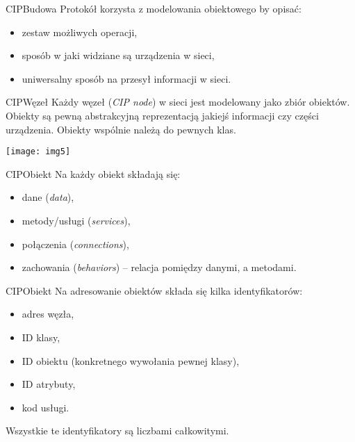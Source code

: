 \documentclass[11pt]{beamer}
\begin{document}
\begin{frame}{CIP}{Budowa}
Protokół korzysta z modelowania obiektowego by opisać:
\begin{itemize}
\item zestaw możliwych operacji,
\item sposób w jaki widziane są urządzenia w sieci,
\item uniwersalny sposób na przesył informacji w sieci.
\end{itemize}
\end{frame}


\begin{frame}{CIP}{Węzeł}
Każdy węzeł (\emph{CIP node}) w sieci jest modelowany jako zbiór obiektów. Obiekty są pewną abstrakcyjną
reprezentacją jakiejś informacji czy części urządzenia. Obiekty wspólnie należą do pewnych klas.

\medskip

\begin{center}
	\texttt{[image: img5]}
\end{center}
\end{frame}


\begin{frame}{CIP}{Obiekt}
Na każdy obiekt składają się:
\begin{itemize}
\item dane (\emph{data}),
\item metody/usługi (\emph{services}),
\item połączenia (\emph{connections}),
\item zachowania (\emph{behaviors}) -- relacja pomiędzy danymi, a metodami.
\end{itemize}
\end{frame}


\begin{frame}{CIP}{Obiekt}
Na adresowanie obiektów składa się kilka identyfikatorów:
\begin{itemize}
\item adres węzła,
\item ID klasy,
\item ID obiektu (konkretnego wywołania pewnej klasy),
\item ID atrybuty,
\item kod usługi.
\end{itemize}

\medskip

Wszystkie te identyfikatory są liczbami całkowitymi.
\end{frame}
\end{document}
